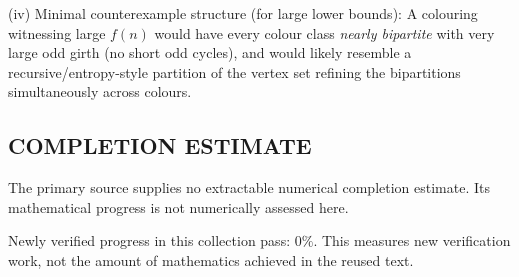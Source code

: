(iv) Minimal counterexample structure (for large lower bounds):
A colouring witnessing large $f(n)$ would have every colour class \emph{nearly bipartite} with very large odd girth (no short odd cycles), and would likely resemble a recursive/entropy-style partition of the vertex set refining the bipartitions simultaneously across colours.




\subsection*{COMPLETION ESTIMATE}
The primary source supplies no extractable numerical completion estimate. Its mathematical progress is not numerically assessed here.

Newly verified progress in this collection pass: $0\%$. This measures new verification work, not the amount of mathematics achieved in the reused text.
